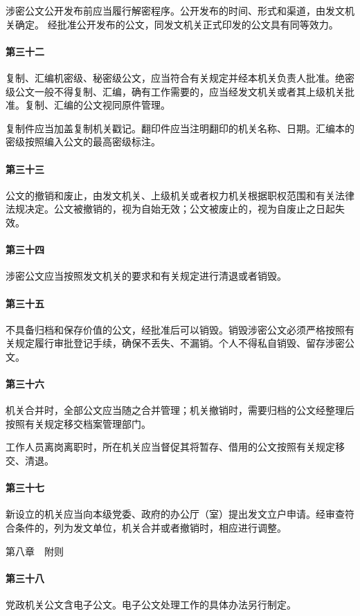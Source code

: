 \documentclass{gbt9704}
\begin{document}
涉密公文公开发布前应当履行解密程序。公开发布的时间、形式和渠道，由发文机关确定。
经批准公开发布的公文，同发文机关正式印发的公文具有同等效力。
\paragraph{第三十二}复制、汇编机密级、秘密级公文，应当符合有关规定并经本机关负责人批准。绝密级公文一般不得复制、汇编，确有工作需要的，应当经发文机关或者其上级机关批准。复制、汇编的公文视同原件管理。

复制件应当加盖复制机关戳记。翻印件应当注明翻印的机关名称、日期。汇编本的密级按照编入公文的最高密级标注。
\paragraph{第三十三}公文的撤销和废止，由发文机关、上级机关或者权力机关根据职权范围和有关法律法规决定。公文被撤销的，视为自始无效；公文被废止的，视为自废止之日起失效。

\paragraph{第三十四}涉密公文应当按照发文机关的要求和有关规定进行清退或者销毁。

\paragraph{第三十五}不具备归档和保存价值的公文，经批准后可以销毁。销毁涉密公文必须严格按照有关规定履行审批登记手续，确保不丢失、不漏销。个人不得私自销毁、留存涉密公文。

\paragraph{第三十六}机关合并时，全部公文应当随之合并管理；机关撤销时，需要归档的公文经整理后按照有关规定移交档案管理部门。

工作人员离岗离职时，所在机关应当督促其将暂存、借用的公文按照有关规定移交、清退。
\paragraph{第三十七}新设立的机关应当向本级党委、政府的办公厅（室）提出发文立户申请。经审查符合条件的，列为发文单位，机关合并或者撤销时，相应进行调整。


第八章　附则


\paragraph{第三十八}党政机关公文含电子公文。电子公文处理工作的具体办法另行制定。
\end{document}
